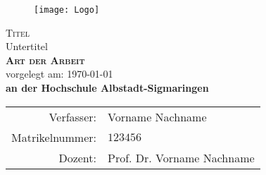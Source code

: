 	\begin{titlepage}
		\renewcommand{\baselinestretch}{1}
		\begin{figure}[htbp]
			\centering
			\texttt{[image: Logo]}
			\label{fig:Logo}
		\end{figure}
		\vspace*{2cm}
		\begin{center}
			\huge \textsf{\textsc{Titel} \\
				{\Large Untertitel}} \\
			\vspace{2cm}
			\LARGE\textbf{\textsc{Art der Arbeit}}\\
			\vspace{0.5cm}
			\normalsize
			vorgelegt am: \today \\
			\vspace{1cm}
			\large \textbf{an der Hochschule Albstadt-Sigmaringen}\\
			\vspace*{\fill}
		\end{center}
		\normalsize{
			\begin{tabular}{rl}
				Verfasser: & {Vorname Nachname} \\
				Matrikelnummer: & $ 123456 $\\
				Dozent: & {Prof. Dr. Vorname Nachname} \\
			\end{tabular}\\
		}
	\end{titlepage}
